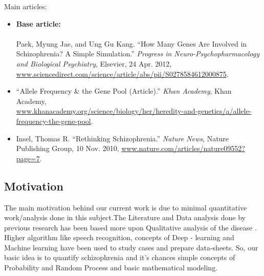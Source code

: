 \documentclass{article}
\begin{document}
Main articles:
\begin{itemize}
    \item \textbf{Base article:}\\ \\
    Paek, Myung Jae, and Ung Gu Kang. “How Many Genes Are Involved in Schizophrenia? A Simple Simulation.” \emph{Progress in Neuro-Psychopharmacology and Biological Psychiatry}, Elsevier, 24 Apr. 2012, \url{www.sciencedirect.com/science/article/abs/pii/S0278584612000875}.
    \item “Allele Frequency \& the Gene Pool (Article).” \emph{Khan Academy}, Khan Academy,\\ \url{www.khanacademy.org/science/biology/her/heredity-and-genetics/a/allele-frequency-the-gene-pool}.
    \item Insel, Thomas R. “Rethinking Schizophrenia.” \emph{Nature News}, Nature Publishing Group, 10 Nov. 2010, \url{www.nature.com/articles/nature09552?page=7}.
\end{itemize}


\subsection{Motivation}
\large
The main motivation behind our current work is due to minimal quantitative work/analysis done in this subject.The Literature and Data analysis done by previous research has been based more upon Qualitative analysis of the disease . Higher algorithm like speech recognition, concepts of Deep - learning and Machine learning have been used to study cases and prepare data-sheets. So, our basic idea is to quantify schizophrenia and it's chances simple concepts of Probability and Random Process and basic mathematical modeling.

\large
\end{document}
